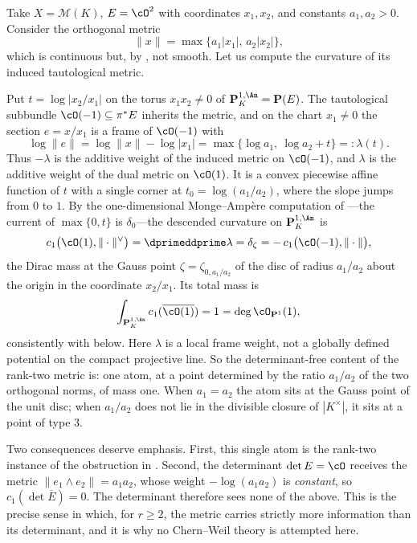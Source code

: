 \begin{example}
\label{ex:ch17-rank-two}
Take $X=\mathcal M(K)$, $E=\cO^2$ with coordinates $x_1,x_2$, and
constants $a_1,a_2>0$.  Consider the orthogonal metric
\[
 \|x\|=\max\{a_1|x_1|,\,a_2|x_2|\},
\]
which is continuous but, by , not
smooth.  Let us compute the curvature of its induced tautological metric.

Put $t=\log|x_2/x_1|$ on the torus $x_1x_2\ne0$ of
$\mathbf P^{1,\An}_K=\mathbf P(E)$.  The
tautological subbundle $\cO(-1)\subseteq\pi^*E$ inherits the metric, and
on the chart $x_1\ne0$ the section $e=x/x_1$ is a frame of $\cO(-1)$
with
\[
 \log\|e\|=\log\|x\|-\log|x_1|
 =\max\{\log a_1,\ \log a_2+t\}=:\lambda(t).
\]
Thus $-\lambda$ is the additive weight of the induced metric on
$\cO(-1)$, and $\lambda$ is the additive weight of the dual metric on
$\cO(1)$.  It is a convex piecewise affine function of $t$ with a single
corner at $t_0=\log(a_1/a_2)$, where the slope jumps from $0$ to $1$.
By the one-dimensional Monge--Amp\`ere computation of
---the current of $\max\{0,t\}$ is
$\delta_0$---the descended curvature on $\mathbf P^{1,\An}_K$ is
\[
 c_1\bigl(\cO(1),\|\cdot\|^{\vee}\bigr)=\dprimeddprime\lambda=\delta_{\zeta}
 =-\,c_1\bigl(\cO(-1),\|\cdot\|\bigr),
\]
the Dirac mass at the Gauss point $\zeta=\zeta_{0,a_1/a_2}$
of the disc of radius $a_1/a_2$ about the origin in the coordinate
$x_2/x_1$.  Its total mass is
\[
 \int_{\mathbf P^{1,\An}_K}c_1(\overline{\cO(1)})=1
 =\deg\cO_{\mathbf P^1}(1),
\]
consistently with  below.
Here $\lambda$ is a local frame weight, not a globally defined potential
on the compact projective line.  So the
determinant-free content of the rank-two metric is: one atom, at a point
determined by the ratio $a_1/a_2$ of the two orthogonal norms, of mass
one.  When $a_1=a_2$ the atom sits at the Gauss point of the unit disc;
when $a_1/a_2$ does not lie in the divisible closure of $|K^\times|$, it
sits at a point of type $3$.

Two consequences deserve emphasis.  First, this single atom is the
rank-two instance of the obstruction in
.  Second, the determinant
$\det E=\cO$ receives the metric
$\|e_1\wedge e_2\|=a_1a_2$, whose weight $-\log(a_1a_2)$ is
\emph{constant}, so $c_1(\det\overline E)=0$.  The determinant therefore
sees none of the above.  This is the precise sense in which, for
$r\ge2$, the metric carries strictly more information than its
determinant, and it is why no Chern--Weil theory is attempted here.
\end{example}

